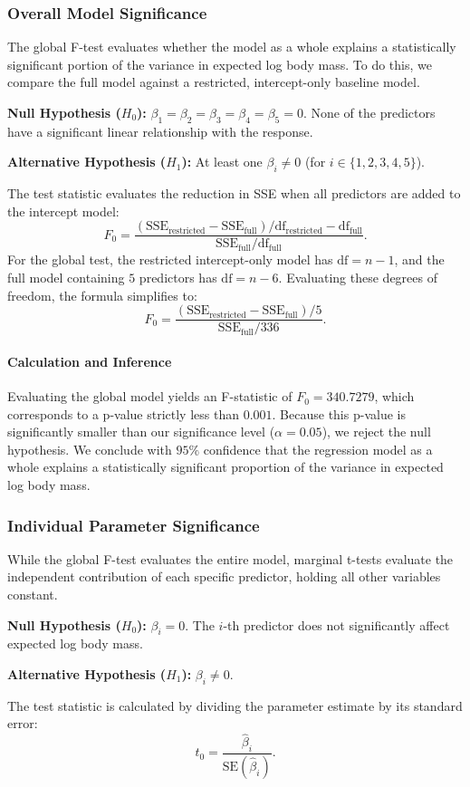 \documentclass[12pt]{article}
\begin{document}
\subsubsection{Overall Model Significance}
The global F-test evaluates whether the model as a whole
explains a statistically significant portion of the variance
in expected log body mass. To do this, we compare the full
model against a restricted, intercept-only baseline model.
\begin{itemize}
    \ii \textbf{Null Hypothesis ($H_0$):} $\beta_1 = \beta_2 =
    \beta_3 = \beta_4 = \beta_5 = 0$. None of the predictors
    have a significant linear relationship with the response.

    \ii \textbf{Alternative Hypothesis ($H_1$):} At least one
    $\beta_i \neq 0$ (for $i \in \{1,2,3,4,5\}$).
\end{itemize}
The test statistic
evaluates the reduction in SSE when
all predictors are added to the intercept model:
\[
  F_0 = \frac{{(\text{SSE}_{\text{restricted}} -
    \text{SSE}_{\text{full}})} / {\mathrm{df}_{\text{restricted}} -
  \mathrm{df}_{\text{full}}}}{\text{SSE}_{\text{full}}
  / \mathrm{df}_{\text{full}}}
.\]
For the global test, the restricted intercept-only model
has $\mathrm{df} = n-1$, and the full model containing $5$ predictors
has $\mathrm{df} = n-6$. Evaluating these degrees of freedom, the
formula simplifies to:
\[
  F_0 = \frac{(\text{SSE}_{\text{restricted}} -
  \text{SSE}_{\text{full}}) / 5}{\text{SSE}_{\text{full}}
  / 336}
.\]

\paragraph{Calculation and Inference}
Evaluating the global model yields an F-statistic of
$F_0 = 340.7279$, which corresponds to a p-value strictly
less than $0.001$. Because
this p-value is significantly smaller than our significance
level ($\alpha = 0.05$), we reject the null hypothesis. We
conclude with $95\%$ confidence that the regression model
as a whole explains a statistically significant proportion
of the variance in expected log body mass.

\subsubsection{Individual Parameter Significance}
While the global F-test evaluates the entire model, marginal
t-tests evaluate the independent contribution of each
specific predictor, holding all other variables constant.
\begin{itemize}
    \ii \textbf{Null Hypothesis ($H_0$):} $\beta_i = 0$. The
    $i$-th predictor does not significantly affect expected
    log body mass.

    \ii \textbf{Alternative Hypothesis ($H_1$):} $\beta_i \neq 0$.
\end{itemize}
The test statistic is calculated by dividing the parameter
estimate by its standard error:
\[
  t_0 = \frac{\hat{\beta}_i}{\text{SE}(\hat{\beta}_i)}
.\]
\end{document}
